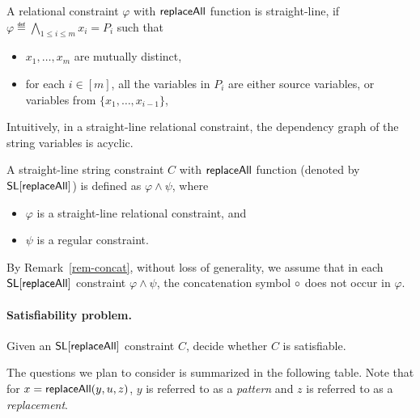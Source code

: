 \begin{definition}
	A relational constraint $ \varphi$ with $\mathsf{replaceAll}$ function is straight-line, if $\varphi \eqdef \bigwedge \limits_{1 \le i \le m} x_i = P_i$ such that
	\begin{itemize}
		\item $x_1,\dots, x_m$ are mutually distinct,
		\item for each $i \in [m]$, all the variables in $P_i$ are either source variables, or variables from $\{x_1,\dots, x_{i-1}\}$,
	\end{itemize}
\end{definition}
Intuitively, in a straight-line relational constraint, the dependency graph of the string variables is acyclic.


\begin{definition}
	A straight-line string constraint $C$ with $\mathsf{replaceAll}$ function (denoted by $\mathsf{SL}[\mathsf{replaceAll}]$)  is defined as $ \varphi \wedge \psi$,  where 
	\begin{itemize}
		\item $\varphi$ is a straight-line relational constraint,  and
		\item $\psi$ is a regular constraint.
	\end{itemize}
\end{definition}

By Remark~\ref{rem-concat}, without loss of generality, we assume that 
in each $\mathsf{SL}[\mathsf{replaceAll}]$ constraint $\varphi \wedge \psi$, the concatenation symbol $\circ$ does not occur in $\varphi$. 



\paragraph*{Satisfiability problem.} Given an $\mathsf{SL}[\mathsf{replaceAll}]$ constraint $C$, decide whether $C$ is satisfiable.

\smallskip

The questions we plan to consider is summarized in the following table. Note that for $x=\mathsf{replaceAll} (y,u,z)$, $y$ is referred to as a \emph{pattern} and $z$ is referred to as a \emph{replacement}.

